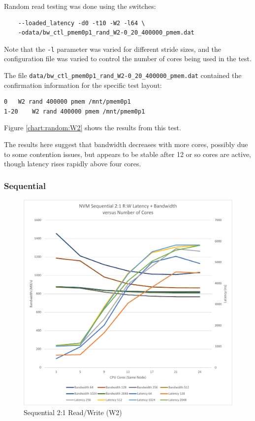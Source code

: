 Random read testing was done using the switches:

\begin{verbatim}
    --loaded_latency -d0 -t10 -W2 -l64 \
    -odata/bw_ctl_pmem0p1_rand_W2-0_20_400000_pmem.dat
\end{verbatim}

Note that the \verb+-l+ parameter was varied for different
stride sizes, and the configuration file was varied to control
the number of cores being used in the test.

The file \verb+data/bw_ctl_pmem0p1_rand_W2-0_20_400000_pmem.dat+ contained the confirmation information
for the specific test layout:

\begin{verbatim}
0	W2 rand 400000 pmem /mnt/pmem0p1
1-20	W2 rand 400000 pmem /mnt/pmem0p1
\end{verbatim}

Figure \ref{chart:random:W2} shows the results from this test.

The results here suggest that bandwidth decreases with more cores,
possibly due to some contention issues, but appears to be stable
after 12 or so cores are active, though latency rises rapidly
above four cores.

\subsubsection{Sequential}

\begin{figure}
    \centering
    \caption{Sequential 2:1 Read/Write (W2)}\label{chart:sequential:W2}
    \includegraphics[scale=0.5]{charts/sequential-w2-crop.pdf}
\end{figure}

